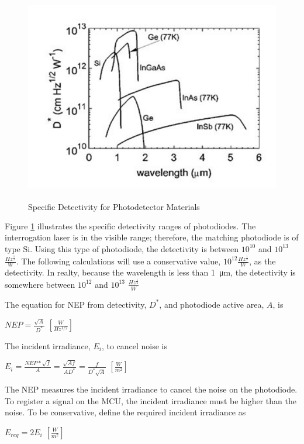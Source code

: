 \documentclass[letterpaper,10pt]{article}
\begin{document}
\begin{spacing}{1.15}
\begin{figure} [H]
	\centering
	\includegraphics[scale=0.4]{detectivity-table.png}
	\label{fig:detectivity-table}
	\caption{Specific Detectivity for Photodetector Materials \textsuperscript{\cite{Optical}} \label{fig:detectivity-table}}
\end{figure}

Figure \ref{fig:detectivity-table} illustrates the specific detectivity ranges of photodiodes. The interrogation laser is in the visible range; therefore, the matching photodiode is of type Si. Using this type of photodiode, the detectivity is between $10^{10}$ and $10^{13}$ $\frac{Hz^{\frac{1}{2}}}{W}$. The following calculations will use a conservative value, $10^{12} \frac{Hz^{\frac{1}{2}}}{W}$, as the detectivity. In realty, because the wavelength is less than \SI{1}{\micro\meter}, the detectivity is somewhere between $10^{12}$ and $10^{13}$ $\frac{Hz^{\frac{1}{2}}}{W}$

The equation for NEP from detectivity, $D^*$, and photodiode active area, $A$,  is 
\begin{center}
	{\large $NEP = \frac{\sqrt{A}}{D^*}$}  $[\frac{W}{Hz^{1/2}}]$
\end{center}

The incident irradiance, $E_i$, to cancel noise is
\begin{center}
	{\large $E_i = \frac{NEP * \sqrt{f}}{A} = \frac{\sqrt{Af}}{AD^*} = \frac{f}{D^*\sqrt{A}}$} $[\frac{W}{m^{2}}]$
\end{center}

The NEP measures the incident irradiance to cancel the noise on the photodiode. To register a signal on the MCU, the incident irradiance must be higher than the noise. To be conservative, define the required incident irradiance as 
\begin{center}
	{\large $E_{req} = 2E_i$} $[\frac{W}{m^{2}}]$
\end{center}


\end{spacing}
\end{document}

